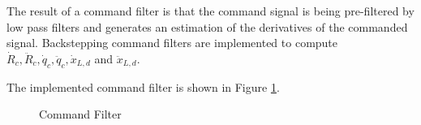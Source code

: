 The result of a command filter is that the command signal is being pre-filtered by low pass filters and generates an estimation of the derivatives of the commanded signal. Backstepping command filters are implemented to compute $ \dot{R}_c, \ddot{R}_c,\dot{q}_c, \ddot{q}_c,\dot{x}_{L,d}$ and $\ddot{x}_{L,d} $. 



The implemented command filter is shown in Figure \ref{fig:set.cf}.
\begin{figure}[h!]
	\centering
	\caption{Command Filter\label{fig:set.cf}}
\end{figure}

